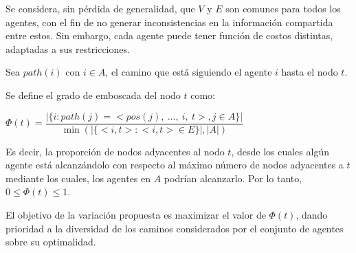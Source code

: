 \documentclass{egpubl}
\begin{document}
Se considera, sin pérdida de generalidad, que $V$ y $E$ son comunes para
todos los agentes, con el fin de no generar inconsistencias en la
información compartida entre estos. Sin embargo, cada agente puede tener
función de costos distintas, adaptadas a sus restricciones.

Sea $path(i)$ con $i \in A$, el camino que está siguiendo el agente
$i$ hasta el nodo $t$.

Se define el grado de emboscada del nodo $t$ como:

$\Phi(t) = \dfrac{|\{ i : path(j) = <pos(j),\ \ldots,\ i,\ t>, j \in A\}|}
	  {\min(|\{ <i,t> : <i,t> \in E \} |,|A|) }$

Es decir, la proporción de nodos adyacentes al nodo $t$,
desde los cuales algún agente está alcanzándolo con
respecto al máximo número de nodos adyacentes a $t$ mediante
los cuales, los agentes en $A$ podrían alcanzarlo. Por lo tanto,
$0 \leq \Phi(t) \leq 1$.

El objetivo de la variación propuesta es maximizar el valor
de $\Phi(t)$, dando prioridad a la diversidad de los caminos
considerados por el conjunto de agentes sobre su optimalidad.
\end{document}
